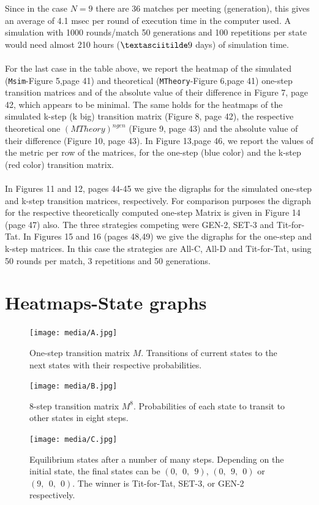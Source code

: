 \documentclass[12pt]{article}
\begin{document}
Since in the case $N=9$ there are 36 matches per meeting (generation), this gives an average of 4.1 msec per round of execution time in the computer used. A simulation with 1000 rounds/match 50 generations and 100 repetitions per state would need almost 210 hours ($\textasciitilde 9$ days) of simulation time.
\\\\
For the last case in the table above, we report the heatmap of the simulated (\texttt{Msim}-Figure 5,page 41) and theoretical (\texttt{MTheory}-Figure 6,page 41) one-step transition matrices and of the absolute value of their difference in Figure 7, page 42, which appears to be minimal. The same holds for the heatmaps of the simulated k-step (k big) transition matrix (Figure 8, page 42), the respective theoretical one $(MTheory)^{ngen}$ (Figure 9, page 43) and the absolute value of their difference (Figure 10, page 43). In Figure 13,page 46, we report the values of the metric per row of the matrices, for the one-step (blue color) and the k-step (red color) transition matrix.
\\\\
In Figures 11 and 12, pages 44-45 we give the digraphs for the simulated one-step and k-step transition matrices, respectively. For comparison purposes the digraph for the respective theoretically computed one-step Matrix is given in Figure 14  (page 47) also. The three strategies competing were GEN-2, SET-3 and Tit-for-Tat. In Figures 15 and 16 (pages 48,49) we give the digraphs for the one-step and k-step matrices. In this case the strategies are All-C, All-D and Tit-for-Tat, using 50 rounds per match, 3 repetitions and 50 generations.


\newpage
\section{Heatmaps-State graphs}

\begin{figure}[h!]
    \centering
    \texttt{[image: media/A.jpg]}
    \caption{One-step transition matrix $M$. Transitions of current states to the next states with their respective probabilities.}
    \label{fig:myimage}
\end{figure}
\begin{figure}[h!]
    \centering
    \texttt{[image: media/B.jpg]}
    \caption{8-step transition matrix $M^8$. Probabilities of each state to transit to other states in eight steps.}
    \label{fig:myimage}
\end{figure}
\begin{figure}[h!]
    \centering
    \texttt{[image: media/C.jpg]}
    \caption{Equilibrium states after a number of many steps. Depending on the initial state, the final states can be $(0,\ \ 0,\ \ 9)$, $(0,\ \ 9,\ \ 0)$ or $(9,\ \ 0,\ \ 0)$. The winner is Tit-for-Tat, SET-3, or GEN-2 respectively.}
    \label{fig:myimage}
\end{figure}
\end{document}

